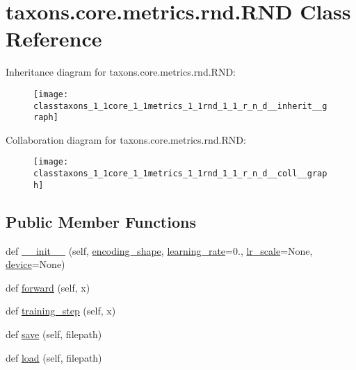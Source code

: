 \hypertarget{classtaxons_1_1core_1_1metrics_1_1rnd_1_1_r_n_d}{}\section{taxons.\+core.\+metrics.\+rnd.\+R\+ND Class Reference}
\label{classtaxons_1_1core_1_1metrics_1_1rnd_1_1_r_n_d}


Inheritance diagram for taxons.\+core.\+metrics.\+rnd.\+R\+ND\+:
\nopagebreak
\begin{figure}[H]
\begin{center}
\leavevmode
\texttt{[image: classtaxons\_1\_1core\_1\_1metrics\_1\_1rnd\_1\_1\_r\_n\_d\_\_inherit\_\_graph]}
\end{center}
\end{figure}


Collaboration diagram for taxons.\+core.\+metrics.\+rnd.\+R\+ND\+:
\nopagebreak
\begin{figure}[H]
\begin{center}
\leavevmode
\texttt{[image: classtaxons\_1\_1core\_1\_1metrics\_1\_1rnd\_1\_1\_r\_n\_d\_\_coll\_\_graph]}
\end{center}
\end{figure}
\subsection*{Public Member Functions}
\begin{DoxyCompactItemize}
\item 
def \hyperlink{classtaxons_1_1core_1_1metrics_1_1rnd_1_1_r_n_d_ac1b399515f63ad68243c108376bd9ff7}{\+\_\+\+\_\+init\+\_\+\+\_\+} (self, \hyperlink{classtaxons_1_1core_1_1metrics_1_1rnd_1_1_r_n_d_a3b97dd30040fee58cb1b1e608b6b39cc}{encoding\+\_\+shape}, \hyperlink{classtaxons_1_1core_1_1metrics_1_1rnd_1_1_r_n_d_a3da7ad05199283ef291f4109805a69ea}{learning\+\_\+rate}=0., \hyperlink{classtaxons_1_1core_1_1metrics_1_1rnd_1_1_r_n_d_a7805647235ce8ca94c1b1a8c35dc96a9}{lr\+\_\+scale}=None, \hyperlink{classtaxons_1_1core_1_1metrics_1_1rnd_1_1_r_n_d_af45514f27a45279be100ce68d6310c58}{device}=None)
\item 
def \hyperlink{classtaxons_1_1core_1_1metrics_1_1rnd_1_1_r_n_d_a85990084e4d60371a9f16e5c695d0f41}{forward} (self, x)
\item 
def \hyperlink{classtaxons_1_1core_1_1metrics_1_1rnd_1_1_r_n_d_ae07dcff537f383706b7c91cf25b2ce8b}{training\+\_\+step} (self, x)
\item 
def \hyperlink{classtaxons_1_1core_1_1metrics_1_1rnd_1_1_r_n_d_aa00fba2bcdca0ea74179a50281b5198e}{save} (self, filepath)
\item 
def \hyperlink{classtaxons_1_1core_1_1metrics_1_1rnd_1_1_r_n_d_a8d647a49e37413d3317c1d2f8da463a5}{load} (self, filepath)
\end{DoxyCompactItemize}
